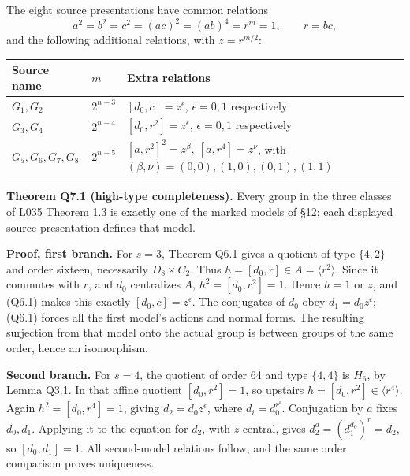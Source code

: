 \documentclass[
  10pt,
  letterpaper,
]{article}
\newcounter{none} %
\begin{document}
The eight source presentations have common relations \[
 a^2=b^2=c^2=(ac)^2=(ab)^4=r^m=1,\qquad r=bc,
\] and the following additional relations, with \(z=r^{m/2}\):

{\def\LTcaptype{none} %
\begin{longtable}[]{@{}
  >{\raggedright\arraybackslash}p{}
  >{\raggedright\arraybackslash}p{}
  >{\raggedright\arraybackslash}p{}@{}}
\toprule\noalign{}
\begin{minipage}[b]{\linewidth}\raggedright
Source name
\end{minipage} & \begin{minipage}[b]{\linewidth}\raggedright
\(m\)
\end{minipage} & \begin{minipage}[b]{\linewidth}\raggedright
Extra relations
\end{minipage} \\
\midrule\noalign{}
\endhead
\bottomrule\noalign{}
\endlastfoot
\(G_1,G_2\) & \(2^{n-3}\) & \([d_0,c]=z^\epsilon\), \(\epsilon=0,1\)
respectively \\
\(G_3,G_4\) & \(2^{n-4}\) & \([d_0,r^2]=z^\epsilon\), \(\epsilon=0,1\)
respectively \\
\(G_5,G_6,G_7,G_8\) & \(2^{n-5}\) &
\([a,r^2]^2=z^\beta,\ [a,r^4]=z^\nu\), with
\((\beta,\nu)=(0,0),(1,0),(0,1),(1,1)\) \\
\end{longtable}
}

\textbf{Theorem Q7.1 (high-type completeness).} Every group in the three
classes of L035 Theorem 1.3 is exactly one of the marked models of §12;
each displayed source presentation defines that model.

\textbf{Proof, first branch.} For \(s=3\), Theorem Q6.1 gives a quotient
of type \(\{4,2\}\) and order sixteen, necessarily \(D_8\times C_2\).
Thus \(h=[d_0,r]\in A=\langle r^2\rangle\). Since it commutes with
\(r\), and \(d_0\) centralizes \(A\), \(h^2=[d_0,r^2]=1\). Hence \(h=1\)
or \(z\), and (Q6.1) makes this exactly \([d_0,c]=z^\epsilon\). The
conjugates of \(d_0\) obey \(d_1=d_0z^\epsilon\); (Q6.1) forces all the
first model's actions and normal forms. The resulting surjection from
that model onto the actual group is between groups of the same order,
hence an isomorphism.

\textbf{Second branch.} For \(s=4\), the quotient of order 64 and type
\(\{4,4\}\) is \(H_6\), by Lemma Q3.1. In that affine quotient
\([d_0,r^2]=1\), so upstairs \(h=[d_0,r^2]\in\langle r^4\rangle\). Again
\(h^2=[d_0,r^4]=1\), giving \(d_2=d_0z^\epsilon\), where
\(d_i=d_0^{r^i}\). Conjugation by \(a\) fixes \(d_0,d_1\). Applying it
to the equation for \(d_2\), with \(z\) central, gives
\(d_2^a=(d_1^{d_0})^r=d_2\), so \([d_0,d_1]=1\). All second-model
relations follow, and the same order comparison proves uniqueness.
\end{document}

